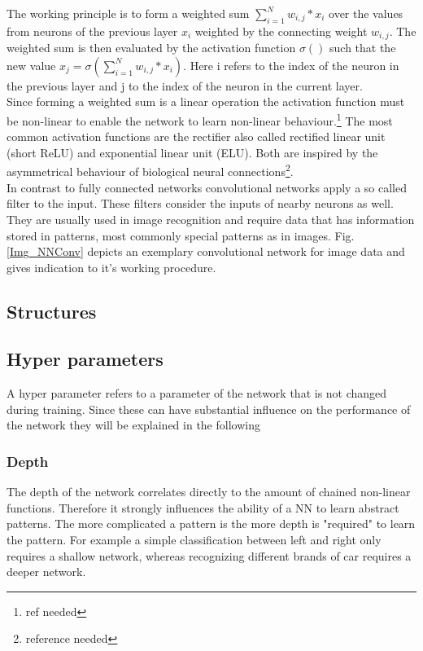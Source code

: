 			The working principle is to form a weighted sum $\sum_{i=1}^{N} w_{i,j} * x_{i}$ over the values from neurons of the previous layer $x_{i}$ weighted by the connecting weight $w_{i,j}$. The weighted sum is then evaluated by the activation function $\sigma()$ such that the new value $x_j = \sigma(\sum_{i=1}^{N} w_{i,j} * x_{i})$. Here i refers to the index of the neuron in the previous layer and j to the index of the neuron in the current layer.\\
			Since forming a weighted sum is a linear operation the activation function must be non-linear to enable the network to learn non-linear behaviour.\footnote{ref needed} The most common activation functions are the rectifier also called rectified linear unit (short ReLU) and exponential linear unit (ELU). Both are inspired by the asymmetrical behaviour of biological neural connections\footnote{reference needed}.\\
		
			In contrast to fully connected networks convolutional networks apply a so called filter to the input. These filters consider the inputs of nearby neurons as well. They are usually used in image recognition and require data that has information stored in patterns, most commonly special patterns as in images. Fig. \ref{Img_NNConv} depicts an exemplary convolutional network for image data and gives indication to it's working procedure.
		
		
		\subsection{Structures}
			
		 
		\subsection{Hyper parameters}
			\label{HyperPar}
			A hyper parameter refers to a parameter of the network that is not changed during training. Since these can have substantial influence on the performance of the network they will be explained in the following
			\subsubsection{Depth}
				The depth of the network correlates directly to the amount of chained non-linear functions. Therefore it strongly influences the ability of a NN to learn abstract patterns. The more complicated a pattern is the more depth is "required" to learn the pattern. For example a simple classification between left and right only requires a shallow network, whereas recognizing different brands of car requires a deeper network.
